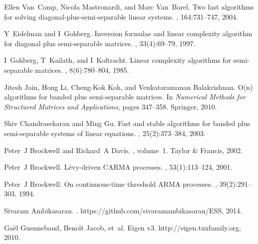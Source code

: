 \documentclass[final,leqno]{siamltex}
\begin{document}
\begin{thebibliography}{10}
Ellen Van~Camp, Nicola Mastronardi, and Marc Van~Barel.
\newblock Two fast algorithms for solving diagonal-plus-semi-separable linear
  systems.
, 164:731--747,
  2004.

Y~Eidelman and I~Gohberg.
\newblock Inversion formulas and linear complexity algorithm for diagonal plus
  semi-separable matrices.
, 33(4):69--79, 1997.

I~Gohberg, T~Kailath, and I~Koltracht.
\newblock Linear complexity algorithms for semi-separable matrices.
, 8(6):780--804, 1985.

Jitesh Jain, Hong Li, Cheng-Kok Koh, and Venkataramanan Balakrishnan.
\newblock O(n) algorithms for banded plus semi-separable matrices.
\newblock In {\em Numerical Methods for Structured Matrices and Applications},
  pages 347--358. Springer, 2010.

Shiv Chandrasekaran and Ming Gu.
\newblock Fast and stable algorithms for banded plus semi-separable systems of
  linear equations.
,
  25(2):373--384, 2003.

Peter~J Brockwell and Richard~A Davis.
, volume~1.
\newblock Taylor \& Francis, 2002.

Peter~J Brockwell.
\newblock L{\'e}vy-driven {CARMA} processes.
,
  53(1):113--124, 2001.

Peter~J Brockwell.
\newblock On continuous-time threshold {ARMA} processes.
, 39(2):291--303,
  1994.

Sivaram Ambikasaran.
.
\newblock https://github.com/sivaramambikasaran/ESS, 2014.

Ga\"{e}l Guennebaud, Beno\^{i}t Jacob, et~al.
\newblock Eigen v3.
\newblock http://eigen.tuxfamily.org, 2010.

\end{thebibliography}
\end{document}
